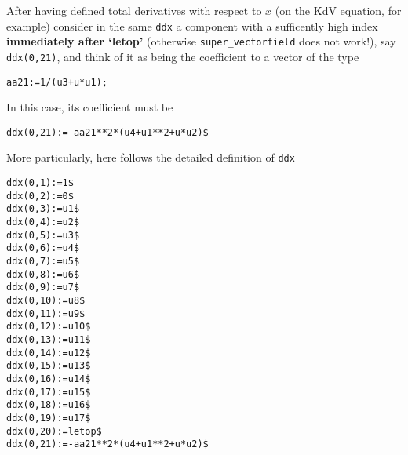 \documentclass[12pt]{amsart}
\theoremstyle{definition}
\begin{document}
After having defined total derivatives with respect to $x$ (on the KdV
equation, for example) consider in the same \texttt{ddx} a component with a
sufficently high index \textbf{immediately after `letop'} (otherwise
\texttt{super\_vectorfield} does not work!), say \texttt{ddx(0,21)}, and think
of it as being the coefficient to a vector of the type
\begin{verbatim}
aa21:=1/(u3+u*u1);
\end{verbatim}
In this case, its coefficient must be
\begin{verbatim}
ddx(0,21):=-aa21**2*(u4+u1**2+u*u2)$
\end{verbatim}
More particularly, here follows the detailed definition of \texttt{ddx}
\begin{verbatim}
ddx(0,1):=1$
ddx(0,2):=0$
ddx(0,3):=u1$
ddx(0,4):=u2$
ddx(0,5):=u3$
ddx(0,6):=u4$
ddx(0,7):=u5$
ddx(0,8):=u6$
ddx(0,9):=u7$
ddx(0,10):=u8$
ddx(0,11):=u9$
ddx(0,12):=u10$
ddx(0,13):=u11$
ddx(0,14):=u12$
ddx(0,15):=u13$
ddx(0,16):=u14$
ddx(0,17):=u15$
ddx(0,18):=u16$
ddx(0,19):=u17$
ddx(0,20):=letop$
ddx(0,21):=-aa21**2*(u4+u1**2+u*u2)$
\end{verbatim}
\end{document}
